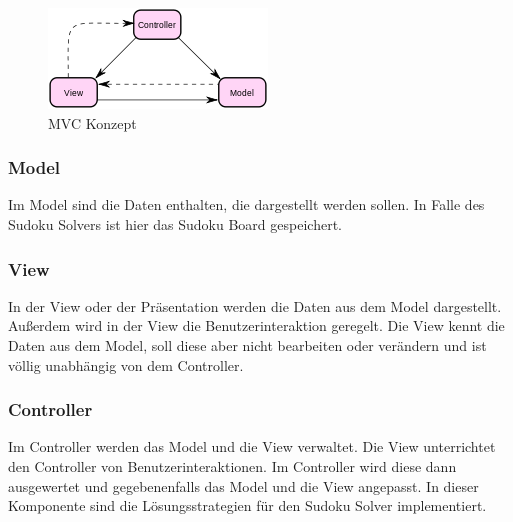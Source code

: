 \begin{figure}[htbp]
	\centering
	\includegraphics{images/MVC.png}
	\caption{\ac{MVC} Konzept}
	\label{fig:MVC}
\end{figure}

\subsubsection{Model}
Im Model sind die Daten enthalten, die dargestellt werden sollen. In Falle des Sudoku Solvers ist hier das Sudoku Board gespeichert.
\subsubsection{View}
In der View oder der Präsentation werden die Daten aus dem Model dargestellt. Außerdem wird in der View die Benutzerinteraktion geregelt. Die View kennt die Daten aus dem Model, soll diese aber nicht bearbeiten oder verändern und ist völlig unabhängig von dem Controller.
\subsubsection{Controller}
Im Controller werden das Model und die View verwaltet. Die View unterrichtet den Controller von Benutzerinteraktionen. Im Controller wird diese dann ausgewertet und gegebenenfalls das Model und die View angepasst.  In dieser Komponente sind die Lösungsstrategien für den Sudoku Solver implementiert.
